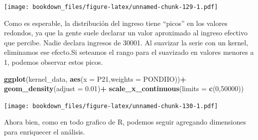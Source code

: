 \documentclass[]{book}
\newenvironment{Shaded}{\begin{snugshade}}{\end{snugshade}}
\newcommand{\DataTypeTok}[1]{\textcolor[rgb]{0.13,0.29,0.53}{#1}}
\newcommand{\DecValTok}[1]{\textcolor[rgb]{0.00,0.00,0.81}{#1}}
\newcommand{\FloatTok}[1]{\textcolor[rgb]{0.00,0.00,0.81}{#1}}
\newcommand{\KeywordTok}[1]{\textcolor[rgb]{0.13,0.29,0.53}{\textbf{#1}}}
\newcommand{\NormalTok}[1]{#1}
\newcommand{\OperatorTok}[1]{\textcolor[rgb]{0.81,0.36,0.00}{\textbf{#1}}}
\newcommand{\StringTok}[1]{\textcolor[rgb]{0.31,0.60,0.02}{#1}}
\begin{document}
\texttt{[image: bookdown\_files/figure-latex/unnamed-chunk-129-1.pdf]}

Como es esperable, la distribución del ingreso tiene ``picos'' en los valores redondos, ya que la gente suele declarar un valor aproximado al ingreso efectivo que percibe. Nadie declara ingresos de 30001. Al suavizar la serie con un kernel, eliminamos ese efecto.Si seteamos el rango para el suavizado en valores menores a 1, podemos observar estos picos.

\begin{Shaded}
\begin{Highlighting}[]
\KeywordTok{ggplot}\NormalTok{(kernel_data, }\KeywordTok{aes}\NormalTok{(}\DataTypeTok{x =}\NormalTok{ P21,}\DataTypeTok{weights =}\NormalTok{ PONDIIO))}\OperatorTok{+}\StringTok{ }
\KeywordTok{geom_density}\NormalTok{(}\DataTypeTok{adjust =} \FloatTok{0.01}\NormalTok{)}\OperatorTok{+}
\KeywordTok{scale_x_continuous}\NormalTok{(}\DataTypeTok{limits =} \KeywordTok{c}\NormalTok{(}\DecValTok{0}\NormalTok{,}\DecValTok{50000}\NormalTok{))}
\end{Highlighting}
\end{Shaded}

\texttt{[image: bookdown\_files/figure-latex/unnamed-chunk-130-1.pdf]}

Ahora bien, como en todo grafico de R, podemos seguir agregando dimensiones para enriquecer el análisis.
\end{document}
